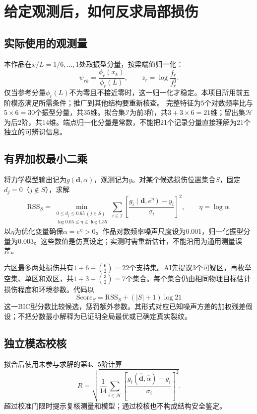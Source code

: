 \documentclass[UTF8,a4paper,11pt,fontset=fandol]{ctexart}
\numberwithin{equation}{section}
\begin{document}
\newpage
\section{给定观测后，如何反求局部损伤}
\subsection{实际使用的观测量}
本作品在$x/L=1/6,\ldots,1$处取振型分量，按梁端值归一化：
\begin{equation}
\psi_{rk}=\frac{\phi_r(x_k)}{\phi_r(L)},\qquad
z_r=\log\frac{f_r}{f_r^0}.
\end{equation}
仅当参考分量$\phi_r(L)$不为零且不接近零时，这一归一化才稳定。本项目所用前五阶模态满足所需条件；推广到其他结构要重新核查。
完整特征为5个对数频率比与$5\times6=30$个振型分量，共35维。拟合集$\mathcal I$为前3阶，共$3+3\times6=21$维；留出集$\mathcal H$为后2阶，共14维。端点归一化分量是常数，不能把21个记录分量直接理解为21个独立的可辨识信息。
\subsection{有界加权最小二乘}
将力学模型输出记为$g(\bm d,\alpha)$，观测记为$y$。对某个候选损伤位置集合$S$，固定$d_j=0$（$j\notin S$），求解
\begin{equation}
\mathrm{RSS}_S=\min\limits_{\substack{0\le d_j\le0.65\ (j\in S)\\
\log0.65\le\eta\le\log1.35}}
\sum_{i\in\mathcal I}
\left[\frac{g_i(\bm d,e^\eta)-y_i}{\sigma_i}\right]^2,
\qquad\eta=\log\alpha.
\end{equation}
以$\eta$为优化变量确保$\alpha=e^\eta>0$。作品对数频率噪声尺度设为0.001，归一化振型分量为0.003。这些数值是仿真设定；实测时需重新估计，不能沿用为通用测量误差。

六区最多两处损伤共有$1+6+\binom62=22$个支持集。AI先提议3个可疑区，再枚举空集、单区和双区，共$1+3+\binom32=7$个集合。每个集合仍由相同物理目标估计损伤程度和环境参数。代码以
\begin{equation}\mathrm{Score}_S=\mathrm{RSS}_S+(|S|+1)\log21\end{equation}
这一BIC型分数比较候选，惩罚额外参数。其形式对应已知噪声方差的加权残差假设；不把分数最小解释为已证明全局最优或已确定真实裂纹。
\subsection{独立模态校核}
拟合后使用未参与求解的第4、5阶计算
\begin{equation}
R=\sqrt{\frac1{14}\sum_{i\in\mathcal H}
\left[\frac{g_i(\hat{\bm d},\hat\alpha)-y_i}{\sigma_i}\right]^2}.
\end{equation}
超过校准门限时提示复核测量和模型；通过校核也不构成结构安全鉴定。
\end{document}

